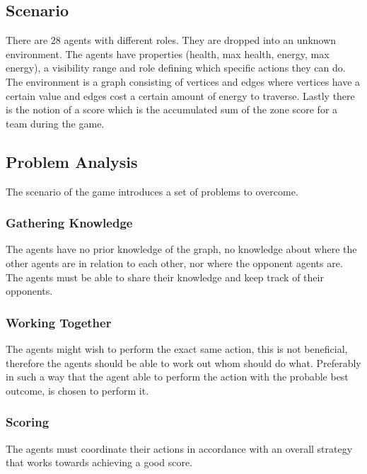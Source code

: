 \documentclass[11pt]{article}
\begin{document}
\subsection{Scenario}
There are 28 agents with different roles. They are dropped into an unknown environment. The agents have properties (health, max health, energy, max energy), a visibility range and role defining which specific actions they can do. The environment is a graph consisting of vertices and edges where vertices have a certain value and edges cost a certain amount of energy to traverse. Lastly there is the notion of a score which is the accumulated sum of the zone score for a team during the game.
 
\subsection{Problem Analysis}
The scenario of the game introduces a set of problems to overcome.

\subsubsection{Gathering Knowledge}
The agents have no prior knowledge of the graph, no knowledge about where the other agents are in relation to each other, nor where the opponent agents are. The agents must be able to share their knowledge and keep track of their opponents.
 
\subsubsection{Working Together}
The agents might wish to perform the exact same action, this is not beneficial, therefore the agents should be able to work out whom should do what. Preferably in such a way that the agent able to perform the action with the probable best outcome, is chosen to perform it. 

\subsubsection{Scoring}
The agents must coordinate their actions in accordance with an overall strategy that works towards achieving a good score.
\end{document}
